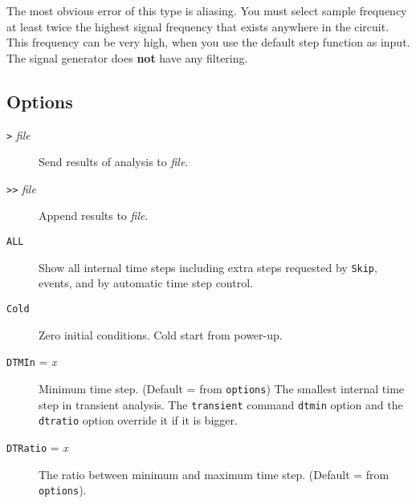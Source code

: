 The most obvious error of this type is aliasing.  You must select sample
frequency at least twice the highest signal frequency that exists anywhere in
the circuit.  This frequency can be very high, when you use the default step
function as input.  The signal generator does {\bf not} have any filtering.
\subsection{Options}

\begin{description}


\item[{\tt >} {\it file}] Send results of analysis to {\it file}.

\item[{\tt >>} {\it file}] Append results to {\it file}.



\item[{\tt ALL}] Show all internal time steps including extra steps
requested by {\tt Skip}, events, and by automatic time step control.

\item[{\tt Cold}] Zero initial conditions.  Cold start from
power-up.



\item[{\tt DTMIn} = {\it x}] Minimum time step.  (Default = from
{\tt options})  The smallest internal time step in transient
analysis.  The {\tt transient} command {\tt dtmin} option and the
{\tt dtratio} option override it if it is bigger.

\item[{\tt DTRatio} = {\it x}] The ratio between minimum and maximum
time step.  (Default = from {\tt options}).


\end{description}
